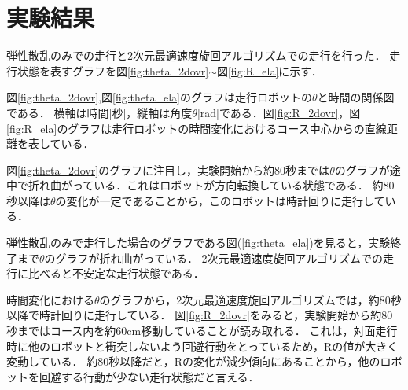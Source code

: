 \documentclass[twocolumn,dvipdfmx]{jarticle}
\begin{document}
\section{実験結果}
弾性散乱のみでの走行と2次元最適速度旋回アルゴリズムでの走行を行った．
走行状態を表すグラフを図\ref{fig:theta_2dovr}$\sim$図\ref{fig:R_ela}に示す．

図\ref{fig:theta_2dovr},図\ref{fig:theta_ela}のグラフは走行ロボットの$\theta$と時間の関係図である．
横軸は時間[秒]，縦軸は角度$\theta$[rad]である．図\ref{fig:R_2dovr}，図\ref{fig:R_ela}のグラフは走行ロボットの時間変化におけるコース中心からの直線距離を表している．

図\ref{fig:theta_2dovr}のグラフに注目し，実験開始から約80秒までは$\theta$のグラフが途中で折れ曲がっている．これはロボットが方向転換している状態である．
約80秒以降は$\theta$の変化が一定であることから，このロボットは時計回りに走行している．


弾性散乱のみで走行した場合のグラフである図(\ref{fig:theta_ela})を見ると，実験終了まで$\theta$のグラフが折れ曲がっている．
2次元最適速度旋回アルゴリズムでの走行に比べると不安定な走行状態である．

時間変化における$\theta$のグラフから，2次元最適速度旋回アルゴリズムでは，約80秒以降で時計回りに走行している．
図\ref{fig:R_2dovr}をみると，実験開始から約80秒まではコース内を約60cm移動していることが読み取れる．
これは，対面走行時に他のロボットと衝突しないよう回避行動をとっているため，Rの値が大きく変動している．
約80秒以降だと，Rの変化が減少傾向にあることから，他のロボットを回避する行動が少ない走行状態だと言える．
\end{document}
